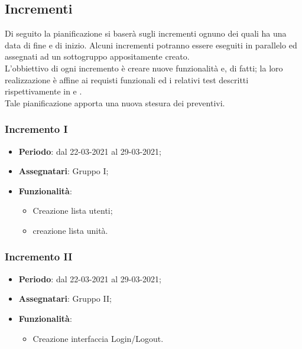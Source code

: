  \newpage

 \subsection{Incrementi}
 Di seguito la pianificazione si baserà sugli incrementi ognuno dei quali ha una data di fine e di inizio. Alcuni incrementi potranno essere eseguiti in parallelo ed assegnati ad un sottogruppo appositamente creato. \\
  L'obbiettivo di ogni incremento è creare nuove funzionalità e, di fatti; la loro realizzazione è affine ai requisti funzionali ed i relativi test descritti rispettivamente in  e .\\
 Tale pianificazione apporta una nuova stesura dei preventivi.

 \subsubsection{Incremento I}
  \begin{itemize}
  	\item \textbf{Periodo}: dal 22-03-2021 al 29-03-2021;
  	\item \textbf{Assegnatari}: Gruppo I;
  	\item \textbf{Funzionalità}:
  		\begin{itemize}
  		\item Creazione lista utenti;
  		\item creazione lista unità.
  	    \end{itemize}
  \end{itemize}

 \subsubsection{Incremento II}
 \begin{itemize}
 	\item \textbf{Periodo}: dal 22-03-2021 al 29-03-2021;
 	\item \textbf{Assegnatari}: Gruppo II;
 	\item \textbf{Funzionalità}:
 	\begin{itemize}
 		\item Creazione interfaccia Login/Logout.
 	\end{itemize}
 \end{itemize}

